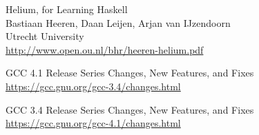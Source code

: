 \begin{thebibliography}{99}
	Helium, for Learning Haskell\\
	Bastiaan Heeren, Daan Leijen, Arjan van IJzendoorn\\
	Utrecht University\\
	\url{http://www.open.ou.nl/bhr/heeren-helium.pdf}
	
	GCC 4.1 Release Series Changes, New Features, and Fixes\\
	\url{https://gcc.gnu.org/gcc-3.4/changes.html}

	GCC 3.4 Release Series Changes, New Features, and Fixes\\
	\url{https://gcc.gnu.org/gcc-4.1/changes.html}
	
\end{thebibliography}
